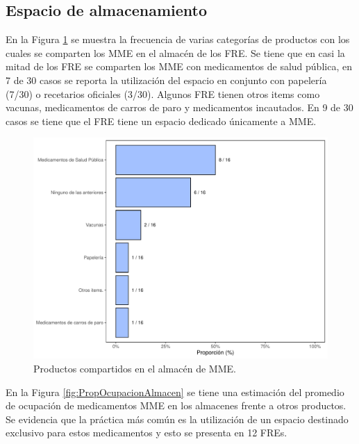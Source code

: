 \documentclass[
  oneside]{book}
\begin{document}
\hypertarget{espacio-de-almacenamiento}{%
\subsection{Espacio de almacenamiento}\label{espacio-de-almacenamiento}}

En la Figura \ref{fig:ProductosCompartidos1} se muestra la frecuencia de varias categorías de productos con los cuales se comparten los MME en el almacén de los FRE. Se tiene que en casi la mitad de los FRE se comparten los MME con medicamentos de salud pública, en 7 de 30 casos se reporta la utilización del espacio en conjunto con papelería (7/30) o recetarios oficiales (3/30). Algunos FRE tienen otros items como vacunas, medicamentos de carros de paro y medicamentos incautados. En 9 de 30 casos se tiene que el FRE tiene un espacio dedicado únicamente a MME.

\begin{figure}[!b]

{\centering \includegraphics[width=0.9\linewidth]{InformeFinal_files/figure-latex/ProductosCompartidos1-1} 

}

\caption{Productos compartidos en el almacén de MME.}\label{fig:ProductosCompartidos1}
\end{figure}

En la Figura \ref{fig:PropOcupacionAlmacen} se tiene una estimación del promedio de ocupación de medicamentos MME en los almacenes frente a otros productos. Se evidencia que la práctica más común es la utilización de un espacio destinado exclusivo para estos medicamentos y esto se presenta en 12 FREs.
\end{document}
